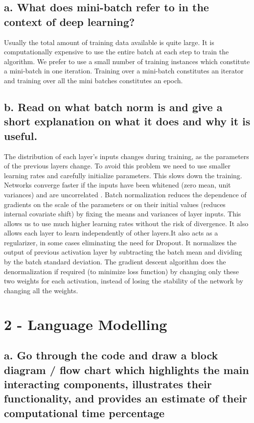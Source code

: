 \documentclass{article}
\begin{document}
\subsection*{a. What does mini-batch refer to in the context of deep learning?}
Usually the total amount of training data available is quite large. It is computationally expensive to use the entire batch at each step to train the algorithm. We prefer to use a small number of training instances which constitute a mini-batch in one iteration. Training over a mini-batch constitutes an iterator and training over all the mini batches constitutes an epoch.


\subsection*{b. Read on what batch norm is and give a short explanation on what it does and
why it is useful.}
The distribution of each layer’s inputs changes during training, as the parameters of the previous layers change. To avoid this problem we need to use smaller learning rates and carefully initialize parameters. This slows down the training. Networks converge faster if the inputs have been whitened (zero mean, unit variances) and are uncorrelated \cite{Efficient_BackProp} \cite{NIPS2011_4421}. Batch normalization reduces the dependence of gradients on the scale of the parameters or on their initial values (reduces internal covariate shift) by fixing the means and variances of layer inputs. This allows us to use much higher learning rates without the risk of divergence. It also allows each layer to learn independently of other layers.It also acts as a regularizer, in some cases eliminating the need for Dropout.
It normalizes the output of previous activation layer by subtracting the batch mean and dividing by the batch standard deviation. The gradient descent algorithm does the denormalization if required (to minimize loss function) by changing only these two weights for each activation, instead of losing the stability of the network by changing all the weights.

\section*{2 - Language Modelling}
\subsection*{a. Go through the code and draw a block diagram / flow chart which highlights the main interacting components, illustrates their functionality, and provides
an estimate of their computational time percentage}
\end{document}
